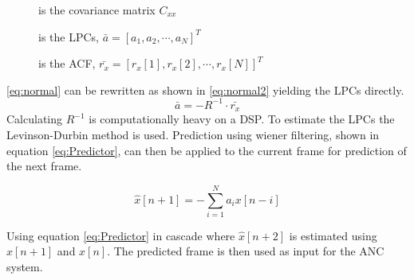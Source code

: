 \begin{description}
	\item[] is the covariance matrix $C_{xx}$
	\item[] is the LPCs, $\bar{a} = [a_1 , a_2, \cdots, a_N]^T$
	\item[] is the ACF, $\bar{r_x} = [r_x[1] , r_x[2], \cdots, r_x[N]]^T$
\end{description}
\autoref{eq:normal} can be rewritten as shown in \autoref{eq:normal2} yielding the LPCs directly.  
 \begin{equation}\label{eq:normal2}
\bar{a} = -R^{-1}\cdot \bar{r_x}
\end{equation}
Calculating $R^{-1}$ is computationally heavy on a DSP. To estimate the LPCs the Levinson-Durbin method is used. Prediction using wiener filtering, shown in equation \ref{eq:Predictor}, can then be applied to the current frame for prediction of the next frame. 

\begin{equation}\label{eq:Predictor}
\hat{x}[n+1] =- \sum^{N}_{i=1}a_ix[n-i]
\end{equation}

Using equation \ref{eq:Predictor} in cascade where $\hat{x}[n+2]$ is estimated using $\hat{x}[n+1]$ and $x[n]$. The predicted frame is then used as input for the ANC system.


